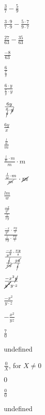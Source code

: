 \documentclass{article}
\begin{document}
\begin{enumerate}[start=28]
    \item $\frac{3}{7} - \frac{5}{9}$
    \begin{center}
        \item $\frac{3 \cdot 9}{7 \cdot 9} - \frac{5 \cdot 7}{9 \cdot 7}$
        \item $\frac{27}{63} - \frac{35}{63}$
        \item $\frac{-8}{63}$
    \end{center}

    \item $\frac{6}{\frac{x}{y}}$
    \begin{center}
        \item $\frac{6 \cdot y}{\frac{x}{y} \cdot y}$
        \item $\frac{6y}{\frac{x}{\cancel{y}} \cdot \cancel{y}}$
        \item $\frac{6y}{x}$
    \end{center}

    \item $\frac{\frac{l}{w}}{m}$
    \begin{center}
        \item $\frac{\frac{l}{w} \cdot m}{m} \cdot m$
        \item $\frac{\frac{l}{w} \cdot m}{\cancel{m}} \cdot \cancel{m}$
        \item $\frac{lm}{w}$
    \end{center}

    \item $\frac{\frac{-x}{y^{2}}}{\frac{z}{xy}}$
    \begin{center}
        \item $\frac{\frac{-x}{y^{2}} \cdot \frac{xy}{z}}{\frac{z}{xy} \cdot \frac{xy}{z}}$
        \item $\frac{\frac{-x}{y^{2}} \cdot \frac{xy}{z}}{\frac{\cancel{z}}{\cancel{xy}} \cdot \frac{\cancel{xy}}{\cancel{z}}}$
        \item $\frac{-x^{2}\cancel{y}}{\cancel{y^{2}}y \cdot z}$
        \item $\frac{-x^{2}}{y \cdot z}$
        \item $-\frac{x^{2}}{yz}$
    \end{center}

    \item $\frac{7}{0}$
    \begin{center}
        \item undefined
    \end{center}

    \item $\frac{0}{X}$, for $X \neq 0$
    \begin{center}
        \item $0$
    \end{center}

    \item $\frac{0}{0}$
    \begin{center}
        \item undefined
    \end{center}
\end{enumerate}
\end{document}
